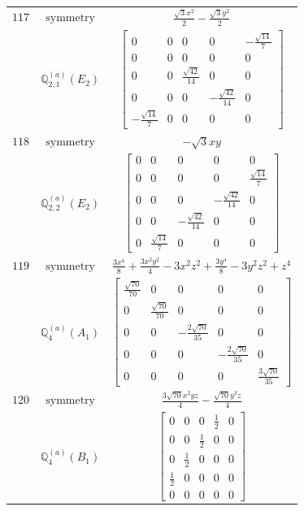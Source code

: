 \documentclass[fleqn,8pt,landscape]{jsarticle}
\begin{document}
\begin{longtable}{ccc}
$ 117 $ & $ \text{symmetry} $ & $ \frac{\sqrt{3} x^{2}}{2} - \frac{\sqrt{3} y^{2}}{2} $ \\
$  $ & $ \mathbb{Q}_{2,1}^{(a)}(E_{2}) $ & $ \begin{bmatrix} 0 & 0 & 0 & 0 & - \frac{\sqrt{14}}{7} \\ 0 & 0 & 0 & 0 & 0 \\ 0 & 0 & \frac{\sqrt{42}}{14} & 0 & 0 \\ 0 & 0 & 0 & - \frac{\sqrt{42}}{14} & 0 \\ - \frac{\sqrt{14}}{7} & 0 & 0 & 0 & 0 \end{bmatrix} $ \\ \hline
$ 118 $ & $ \text{symmetry} $ & $ - \sqrt{3} x y $ \\
$  $ & $ \mathbb{Q}_{2,2}^{(a)}(E_{2}) $ & $ \begin{bmatrix} 0 & 0 & 0 & 0 & 0 \\ 0 & 0 & 0 & 0 & \frac{\sqrt{14}}{7} \\ 0 & 0 & 0 & - \frac{\sqrt{42}}{14} & 0 \\ 0 & 0 & - \frac{\sqrt{42}}{14} & 0 & 0 \\ 0 & \frac{\sqrt{14}}{7} & 0 & 0 & 0 \end{bmatrix} $ \\ \hline
$ 119 $ & $ \text{symmetry} $ & $ \frac{3 x^{4}}{8} + \frac{3 x^{2} y^{2}}{4} - 3 x^{2} z^{2} + \frac{3 y^{4}}{8} - 3 y^{2} z^{2} + z^{4} $ \\
$  $ & $ \mathbb{Q}_{4}^{(a)}(A_{1}) $ & $ \begin{bmatrix} \frac{\sqrt{70}}{70} & 0 & 0 & 0 & 0 \\ 0 & \frac{\sqrt{70}}{70} & 0 & 0 & 0 \\ 0 & 0 & - \frac{2 \sqrt{70}}{35} & 0 & 0 \\ 0 & 0 & 0 & - \frac{2 \sqrt{70}}{35} & 0 \\ 0 & 0 & 0 & 0 & \frac{3 \sqrt{70}}{35} \end{bmatrix} $ \\ \hline
$ 120 $ & $ \text{symmetry} $ & $ \frac{3 \sqrt{70} x^{2} y z}{4} - \frac{\sqrt{70} y^{3} z}{4} $ \\
$  $ & $ \mathbb{Q}_{4}^{(a)}(B_{1}) $ & $ \begin{bmatrix} 0 & 0 & 0 & \frac{1}{2} & 0 \\ 0 & 0 & \frac{1}{2} & 0 & 0 \\ 0 & \frac{1}{2} & 0 & 0 & 0 \\ \frac{1}{2} & 0 & 0 & 0 & 0 \\ 0 & 0 & 0 & 0 & 0 \end{bmatrix} $ \\ \hline

\end{longtable}
\end{document}
